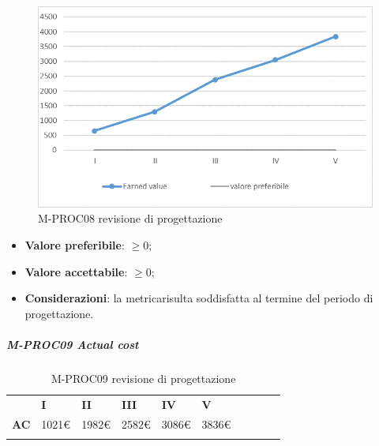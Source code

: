 \begin{figure}[H] 	
	\includegraphics[width=\linewidth]{./img/grafici/RP5.png}	
	\caption{M-PROC08 revisione di progettazione\glo}	
\end{figure}
\begin{itemize}
	\item \textbf{Valore preferibile}: $\ge0$;
	\item \textbf{Valore accettabile}: $\ge0$;
	\item \textbf{Considerazioni}: la metrica\glosp risulta soddisfatta al termine del periodo di progettazione\glo.
\end{itemize}
\subparagraph{M-PROC09 Actual cost} \mbox{}
\begin{longtable}[H!] {						
		>{}p{38mm}  		
		>{}p{12mm}
		>{}p{12mm}		
		>{}p{12mm}		
		>{}p{12mm}		
		>{}p{12mm}		
		>{}p{12mm}
		>{}p{12mm}
		>{}p{12mm}
		>{}p{12mm}
	}
	\rowcolor{gray!50}
	\textbf{} & \textbf{I} & \textbf{II} & \textbf{III} & \textbf{IV} & \textbf{V} \TBstrut \\ [2mm]
	\textbf{AC} & 1021\euro & 1982\euro & 2582\euro & 3086\euro & 3836\euro \TBstrut \\ [2mm]
	\rowcolor{white}
	\caption{M-PROC09 revisione di progettazione\glo}
\end{longtable}
